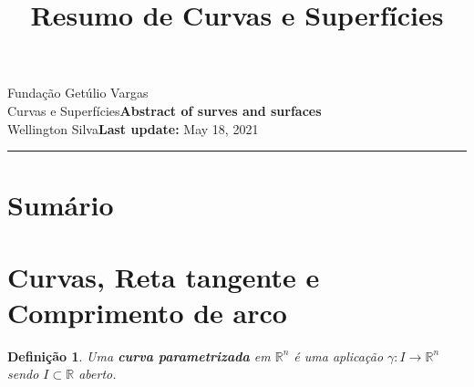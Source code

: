 \documentclass{article}
\title{Resumo de Curvas e Superfícies}
\author{}
\date{}
\newtheorem{definition}{Definição}
\newcommand{\assignment}{Abstract of surves and surfaces}
\newcommand{\duedate}{May 18, 2021}
\begin{document}
Fundação Getúlio Vargas\hfill\\
Curvas e Superfícies\hfill\textbf{\assignment}\\
Wellington Silva\hfill\textbf{Last update:} \duedate\\
\smallskip\hrule\bigskip

{\let\newpage\relax\maketitle}
\maketitle

\section*{Sumário}

\textbf{}
\vspace{4.0mm}

\textbf{}
\vspace{4.0mm}

\textbf{}
\vspace{4.0mm}

\textbf{}
\vspace{4.0mm}

\textbf{}
\vspace{4.0mm}

\textbf{}
\vspace{4.0mm}

\textbf{}
\vspace{4.0mm}

\textbf{}
\vspace{4.0mm}

\textbf{}
\vspace{4.0mm}

\textbf{}
\vspace{4.0mm}

\newpage

\section*{Curvas, Reta tangente e Comprimento de arco}
\label{s1}

\begin{definition}
Uma \textbf{curva parametrizada} em $\mathbb{R}^n$ é uma aplicação $\gamma: I \rightarrow \mathbb{R}^n$ sendo $I \subset \mathbb{R}$ aberto.
\end{definition}
\end{document}

